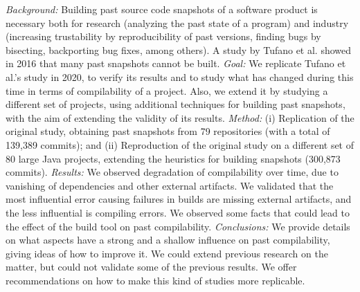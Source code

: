 \textit{Background:} Building past source code snapshots of a software product is necessary both for research (analyzing the past state of a program) and industry (increasing trustability by reproducibility of past versions, finding bugs by bisecting, backporting bug fixes, among others). A study by Tufano et al. showed in 2016 that many past snapshots cannot be built. %
\textit{Goal:} We replicate Tufano et al.'s study in 2020, to verify its results and to study what has changed during this time in terms of compilability of a project. Also, we extend it by studying a different set of projects, using additional techniques for building past snapshots, with the aim of extending the validity of its results.
\textit{Method:}  (i) Replication of the original study, obtaining past snapshots from 79 repositories (with a total of 139,389 commits); and (ii) Reproduction of the original study on a different set of 80 large Java projects, extending the heuristics for building snapshots (300,873 commits).
\textit{Results:} %
We observed degradation of compilability over time, due to vanishing of dependencies and other external artifacts. We validated that the most influential error causing failures in builds are missing external artifacts, and the less influential is compiling errors. We observed some facts that could lead to the effect of the build tool on past compilability.
\textit{Conclusions:} We provide details on what aspects have a strong and a shallow influence on past compilability, giving ideas of how to improve it. We could extend previous research on the matter, but could not validate some of the previous results. We offer recommendations on how to make this kind of studies more replicable. 
